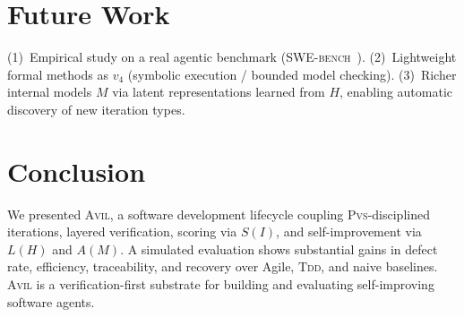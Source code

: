 \documentclass[10pt,twocolumn,letterpaper]{article}
\theoremstyle{definition}
\theoremstyle{plain}
\newcommand{\AVIL}{\textsc{Avil}}
\newcommand{\PVS}{\textsc{Pvs}}
\newcommand{\TDD}{\textsc{Tdd}}
\begin{document}
\section{Future Work}\label{sec:future}

(1)~Empirical study on a real agentic benchmark
(\textsc{SWE-bench}~\citep{jimenez2024swebench}).
(2)~Lightweight formal methods as $v_4$ (symbolic execution /
bounded model checking).
(3)~Richer internal models $M$ via latent representations learned
from $H$, enabling automatic discovery of new iteration types.

\section{Conclusion}\label{sec:conclusion}

We presented \AVIL{}, a software development lifecycle coupling
\PVS{}-disciplined iterations, layered verification, scoring via
$S(I)$, and self-improvement via $L(H)$ and $A(M)$. A simulated
evaluation shows substantial gains in defect rate, efficiency,
traceability, and recovery over Agile, \TDD{}, and naive baselines.
\AVIL{} is a verification-first substrate for building and evaluating
self-improving software agents.


\end{document}
